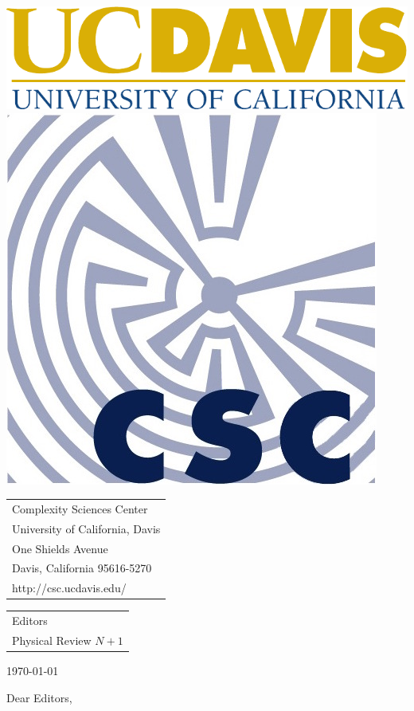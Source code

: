 \documentclass{article}
\begin{document}
\includegraphics[height=3\baselineskip]{expanded_logo_cmyk_gold-blue}
\hspace{3.7in}
\includegraphics[height=5\baselineskip]{Logo_CSC}

\hrulefill

\hfill
\begin{tabular}{l@{}}
  Complexity Sciences Center\\
  University of California, Davis\\
  One Shields Avenue\\
  Davis, California 95616-5270\\
  http://csc.ucdavis.edu/
\end{tabular}

\bigskip\bigskip

\begin{tabular}[t]{@{}l}
  Editors\\
  Physical Review $N+1$
\end{tabular}
\hfill
\today

\bigskip

Dear Editors,
\end{document}
